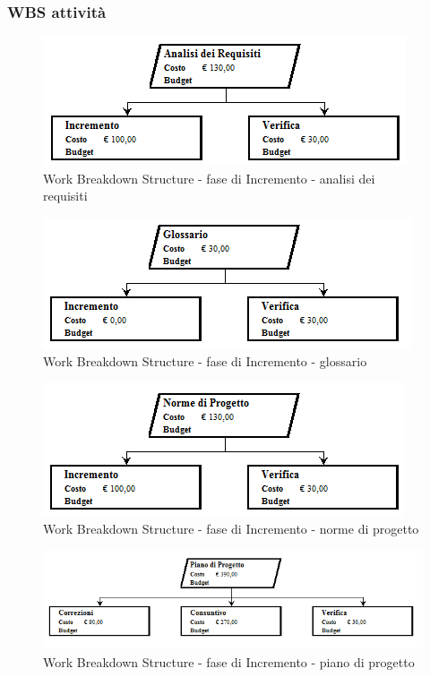 \documentclass[a4paper]{article}
\begin{document}
			\subsubsection{WBS attività}
				\begin{figure}[H]
					\centering
					\includegraphics[width=\textwidth]{wbs/wbs_incremento_1}
					\caption{Work Breakdown Structure - fase di Incremento - analisi dei requisiti}
				\end{figure}
				\begin{figure}[H]
					\centering
					\includegraphics[width=\textwidth]{wbs/wbs_incremento_2}
					\caption{Work Breakdown Structure - fase di Incremento - glossario}
				\end{figure}
				\begin{figure}[H]
					\centering
					\includegraphics[width=\textwidth]{wbs/wbs_incremento_3}
					\caption{Work Breakdown Structure - fase di Incremento - norme di progetto}
				\end{figure}
				\begin{figure}[H]
					\centering
					\includegraphics[width=\textwidth]{wbs/wbs_incremento_4}
					\caption{Work Breakdown Structure - fase di Incremento - piano di progetto}
				\end{figure}
\end{document}
